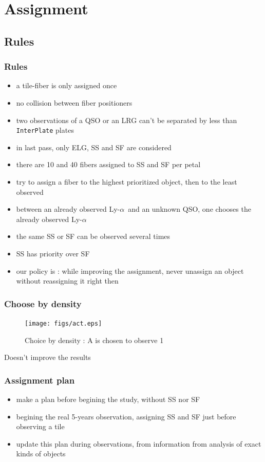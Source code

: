 \documentclass{beamer}
\def\lya{Ly-$\alpha$\ }
\begin{document}
\section{Assignment}
\subsection{Rules}
\begin{frame}\frametitle{Rules}
\begin{itemize}
	\item a tile-fiber is only assigned once
	\item no collision between fiber positioners
	\item two observations of a QSO or an LRG can't be separated by less than {\tt InterPlate} plates
	\item in last pass, only ELG, SS and SF are considered
	\item there are 10 and 40 fibers assigned to SS and SF per petal
	\item try to assign a fiber to the highest prioritized object, then to the least observed
	\item between an already observed \lya and an unknown QSO, one chooses the already observed \lya
	\item the same SS or SF can be observed several times
	\item SS has priority over SF
	\item our policy is : while improving the assignment, never unassign an object without reassigning it right then
\end{itemize}
\end{frame}

\begin{frame}\frametitle{Choose by density}
\begin{figure}[H]\begin{center}
	\texttt{[image: figs/act.eps]}
	\caption{Choice by density : A is chosen to observe 1}\label{act}
\end{center}\end{figure}
Doesn't improve the results
\end{frame}

\begin{frame}\frametitle{Assignment plan}
	\begin{itemize}
		\item make a plan before begining the study, without SS nor SF
		\item begining the real 5-years observation, assigning SS and SF just before observing a tile
		\item update this plan during observations, from information from analysis of exact kinds of objects
	\end{itemize}
\end{frame}
\end{document}
